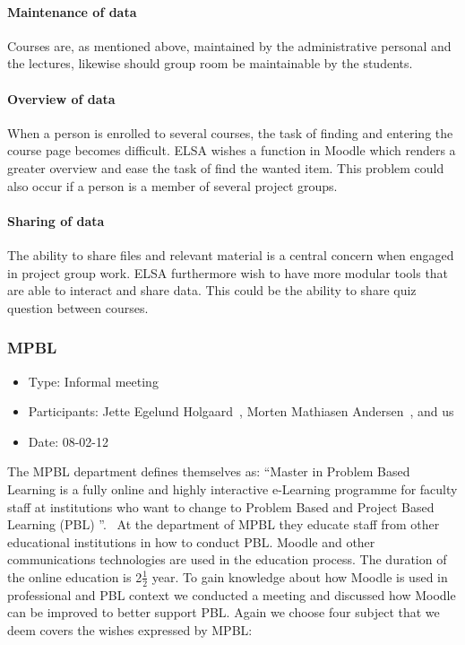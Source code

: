 \paragraph{Maintenance of data} Courses are, as mentioned above, maintained by the administrative personal and the lectures, likewise should group room be maintainable by the students. 
\paragraph{Overview of data} When a person is enrolled to several courses, the task of finding and entering the course page becomes difficult. 
ELSA wishes a function in Moodle which renders a greater overview and ease the task of find the wanted item. 
This problem could also occur if a person is a member of several project groups.
\paragraph{Sharing of data} The ability to share files and relevant material is a central concern when engaged in project group work. ELSA furthermore wish to have more modular tools that are able to interact and share data.
This could be the ability to share quiz question between courses. 


\subsubsection{MPBL}
\begin{itemize}
	\item Type: Informal meeting
	\item Participants: Jette Egelund Holgaard~\cite{jette}, Morten Mathiasen Andersen~\cite{morten}, and us
	\item Date: 08-02-12
\end{itemize}
The MPBL department defines themselves as:
``Master in Problem Based Learning is a fully online and highly interactive e-Learning programme for faculty staff at institutions who want to change to Problem Based and Project Based Learning (PBL) ''.~\cite{mpbl}
At the department of MPBL they educate staff from other educational institutions in how to conduct PBL.
Moodle and other communications technologies are used in the education process. 
The duration of the online education is 2$\frac{1}{2}$ year.
To gain knowledge about how Moodle is used in professional and PBL context we conducted a meeting and discussed how Moodle can be improved to better support PBL. Again we choose four subject that we deem covers the wishes expressed by MPBL:

